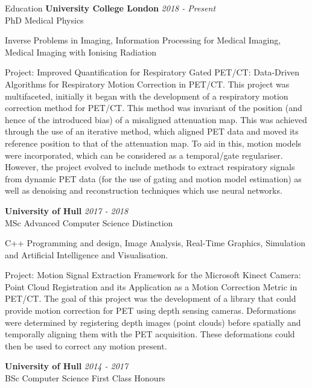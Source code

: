 \documentclass{cv}
\begin{document}
    \begin{rSection}{Education}
        {\bf University College London} \hfill {\em 2018 - Present} 
        \\ PhD Medical Physics
        
        \item Inverse Problems in Imaging, Information Processing for Medical Imaging, Medical Imaging with Ionising Radiation
        
        \item Project: Improved Quantification for Respiratory Gated PET/CT: Data-Driven Algorithms for Respiratory Motion Correction in PET/CT. This project was multifaceted, initially it began with the development of a respiratory motion correction method for PET/CT. This method was invariant of the position (and hence of the introduced bias) of a misaligned attenuation map. This was achieved through the use of an iterative method, which aligned PET data and moved its reference position to that of the attenuation map. To aid in this, motion models were incorporated, which can be considered as a temporal/gate regulariser. However, the project evolved to include methods to extract respiratory signals from dynamic PET data (for the use of gating and motion model estimation) as well as denoising and reconstruction techniques which use neural networks.
        
        {\bf University of Hull} \hfill {\em 2017 - 2018} 
        \\ MSc Advanced Computer Science \hfill {Distinction}
        
        \item C++ Programming and design, Image Analysis, Real-Time Graphics, Simulation and Artificial Intelligence and Visualisation.
        
        \item Project: Motion Signal Extraction Framework for the Microsoft Kinect Camera: Point Cloud Registration and its Application as a Motion Correction Metric in PET/CT. The goal of this project was the development of a library that could provide motion correction for PET using depth sensing cameras. Deformations were determined by registering depth images (point clouds) before spatially and temporally aligning them with the PET acquisition. These deformations could then be used to correct any motion present.
        
        {\bf University of Hull} \hfill {\em 2014 - 2017} 
        \\ BSc Computer Science \hfill {First Class Honours}
        

\end{rSection}
\end{document}
